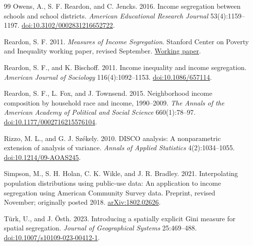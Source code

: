 \documentclass[11pt]{article}
\begin{document}
\begin{thebibliography}{99}
Owens, A., S. F. Reardon, and C. Jencks. 2016.
Income segregation between schools and school districts.
\emph{American Educational Research Journal} 53(4):1159--1197.
\href{https://doi.org/10.3102/0002831216652722}{doi:10.3102/0002831216652722}.

Reardon, S. F. 2011. \emph{Measures of Income Segregation}.
Stanford Center on Poverty and Inequality working paper, revised September.
\href{https://inequality.stanford.edu/sites/default/files/reardon_measures-income-seg.pdf}{Working paper}.

Reardon, S. F., and K. Bischoff. 2011.
Income inequality and income segregation.
\emph{American Journal of Sociology} 116(4):1092--1153.
\href{https://doi.org/10.1086/657114}{doi:10.1086/657114}.

Reardon, S. F., L. Fox, and J. Townsend. 2015.
Neighborhood income composition by household race and income, 1990--2009.
\emph{The Annals of the American Academy of Political and Social Science}
660(1):78--97.
\href{https://doi.org/10.1177/0002716215576104}{doi:10.1177/0002716215576104}.

Rizzo, M. L., and G. J. Sz\'ekely. 2010.
DISCO analysis: A nonparametric extension of analysis of variance.
\emph{Annals of Applied Statistics} 4(2):1034--1055.
\href{https://doi.org/10.1214/09-AOAS245}{doi:10.1214/09-AOAS245}.

Simpson, M., S. H. Holan, C. K. Wikle, and J. R. Bradley. 2021.
Interpolating population distributions using public-use data:
An application to income segregation using American Community Survey data.
Preprint, revised November; originally posted 2018.
\href{https://arxiv.org/abs/1802.02626}{arXiv:1802.02626}.

T\"urk, U., and J. \"Osth. 2023.
Introducing a spatially explicit Gini measure for spatial segregation.
\emph{Journal of Geographical Systems} 25:469--488.
\href{https://doi.org/10.1007/s10109-023-00412-1}{doi:10.1007/s10109-023-00412-1}.
\end{thebibliography}
\end{document}
